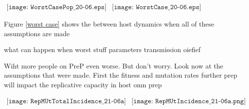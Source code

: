 \documentclass[DIV=15]{scrartcl}
\begin{document}


  
  
   


  
  \begin{figure*}[h]
 \begin{center}$
 \begin{array}{cc}
 \texttt{[image: WorstCasePop\_20-06.eps]} &
 \texttt{[image: WorstCase\_20-06.eps]}
 \end{array}$
 \end{center}
	\caption{Solution to equations(\ref{between host eqns1}-\ref{between host eqns4}). PrEP is introduced at $t=0$, there is a decrease in the number  of infections (COMPARE TO REAL).  But  the relative incidence of resistant virus increases massively during the $20$ years following introduction of PrEP }
\label{worst case} 
\end{figure*}

Figure  \ref{worst case} shows the between host dynamics when all of these assumptions are made 

what can happen when worst stuff parameters transmission oiefief
  
  Wiht more people  on PreP even worse. But don't worry. Look now at the assumptions that were made.  First the fitness  and mutation rates  
 further prep will impact the replicative capacity in host omn prep 



  
  \begin{figure*}[h]
 \begin{center}$
 \begin{array}{cc}
 \texttt{[image: RepMUtTotalIncidence\_21-06a]} &
 \texttt{[image: RepMUtIncidence\_21-06a.png]}
 \end{array}$
 \end{center}
	\caption{ Equilibrium values of the relative incidence for the resistant strain 
	and the total incidence. A lower replication rate for the resistant strain soon reduces the etc }
\label{mutationreplication} 
\end{figure*}
\end{document}
